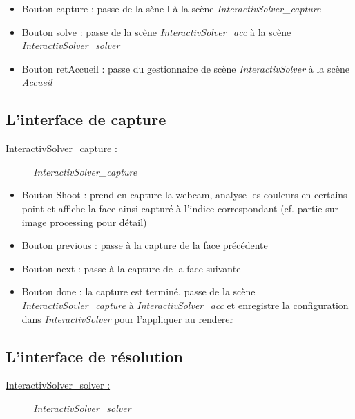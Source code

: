 \begin{itemize}
    \item Bouton capture : passe de la sène l à la scène \textit{InteractivSolver\_capture}
    \item Bouton solve : passe de la scène \textit{InteractivSolver\_acc} à la scène \textit{InteractivSolver\_solver}
    \item Bouton retAccueil : passe du gestionnaire de scène \textit{InteractivSolver} à la scène \textit{Accueil}
\end{itemize}

\subsection{L'interface de capture}
\underline{InteractivSolver\_capture :}

\begin{figure}[h]
\begin{center}
\end{center}
	\caption{ \textit{InteractivSolver\_capture}}
\end{figure}

\begin{itemize}
    \item Bouton Shoot : prend en capture la webcam, analyse les couleurs en certains point et affiche la face ainsi capturé à l’indice correspondant (cf. partie sur image processing pour détail)
    \item Bouton previous : passe à la capture de la face précédente
    \item Bouton next : passe à la capture de la face suivante
    \item Bouton done : la capture est terminé, passe de la scène \textit{InteractivSovler\_capture} à \textit{InteractivSolver\_acc} et enregistre la configuration dans \textit{InteractivSolver} pour l'appliquer au renderer
\end{itemize}

\subsection{L'interface de résolution}
\underline{InteractivSolver\_solver :}

\begin{figure}[h]
\begin{center}
\end{center}
	\caption{ \textit{InteractivSolver\_solver}}
\end{figure}

